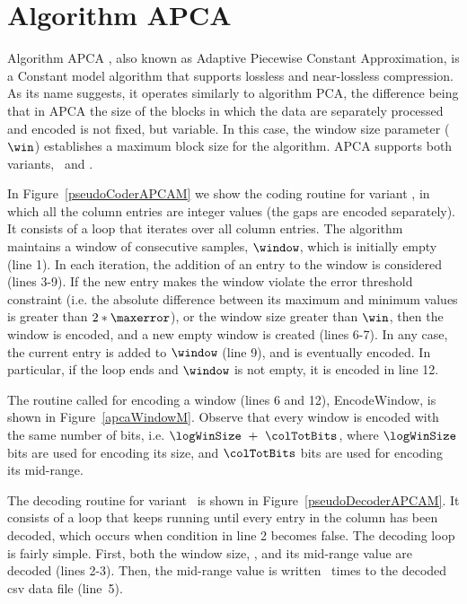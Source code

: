
\clearpage

\section{Algorithm APCA}
\label{algo:apca}


Algorithm APCA \cite{coder:apca}, also known as Adaptive Piecewise Constant Approximation, is a Constant model algorithm that supports lossless and near-lossless compression. As its name suggests, it operates similarly to algorithm PCA, the difference being that in APCA the size of the blocks in which the data are separately processed and encoded is not fixed, but variable. In this case, the window size parameter ($\win$) establishes a maximum block size for the algorithm. APCA supports both variants, \maskalgo\ and \NOmaskalgo.


In Figure~\ref{pseudoCoderAPCAM} we show the coding routine for variant \maskalgo, in which all the column entries are integer values (the gaps are encoded separately). It consists of a loop that iterates over all column entries. The algorithm maintains a window of consecutive samples, $\window$, which is initially empty (line 1). In each iteration, the addition of an entry to the window is considered (lines 3-9). If the new entry makes the window violate the error threshold constraint (i.e. the absolute difference between its maximum and minimum values is greater than $2*\maxerror$), or the window size greater than $\win$, then the window is encoded, and a new empty window is created (lines 6-7). In any case, the current entry is added to $\window$ (line 9), and is eventually encoded. In particular, if the loop ends and $\window$ is not empty, it is encoded in line 12. 





\vspace{+2pt}
The routine called for encoding a window (lines 6 and 12), EncodeWindow, is shown in Figure~\ref{apcaWindowM}. Observe that every window is encoded with the same number of bits, i.e. $\logWinSize\ +\ \colTotBits$, where $\logWinSize$ bits are used for encoding its size, and $\colTotBits$ bits are used for encoding its mid-range.
\vspace{+3pt}





\clearpage


The decoding routine for variant \maskalgo\ is shown in Figure~\ref{pseudoDecoderAPCAM}. It consists of a loop that keeps running until every entry in the column has been decoded, which occurs when condition in line 2 becomes false. The decoding loop is fairly simple. First, both the window size, \sizee, and its mid-range value are decoded (lines 2-3). Then, the mid-range value is written \sizee\ times to the decoded csv data file (line~5).


